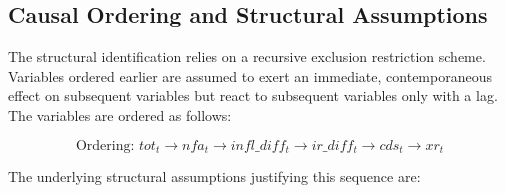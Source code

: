 \documentclass[11pt,a4paper]{article}
\begin{document}
\subsection{Causal Ordering and Structural Assumptions}

The structural identification relies on a recursive exclusion restriction scheme. Variables ordered earlier are assumed to exert an immediate, contemporaneous effect on subsequent variables but react to subsequent variables only with a lag. The variables are ordered as follows:

\begin{equation}
\text{Ordering: } tot_t \longrightarrow nfa_t \longrightarrow infl\_diff_t \longrightarrow ir\_diff_t \longrightarrow cds_t \longrightarrow xr_t
\label{eq:ordering}
\end{equation}

The underlying structural assumptions justifying this sequence are:
\end{document}
